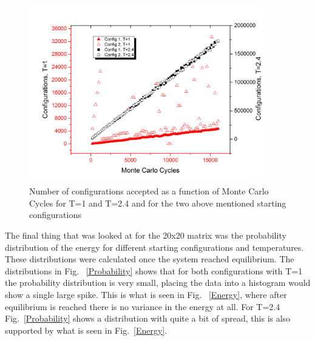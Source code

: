 \documentclass[12pt,righttag]{article}
\begin{document}
		\begin{figure}
			
			\includegraphics[width=4in]{Graph05.png}
			
			
			
			\caption{\label{Accptance} Number of configurations accepted as a function of Monte Carlo Cycles for T=1 and T=2.4 and for the two above mentioned starting configurations}
		\end{figure}
	The final thing that was looked at for the 20x20 matrix was the probability distribution of the energy for different starting configurations and temperatures. These distributions were calculated once the system reached equilibrium. The distributions in Fig. ~\ref{Probability} shows that for both configurations with T=1 the probability distribution is very small, placing the data into a histogram would show a single large spike. This is what is seen in Fig. ~\ref{Energy}, where after equilibrium is reached there is no variance in the energy at all. For T=2.4 Fig.~\ref{Probability} shows a distribution with quite a bit of spread, this is also supported by what is seen in Fig.~\ref{Energy}.
	
		
		
		
		
		
		
		
		
\end{document}

